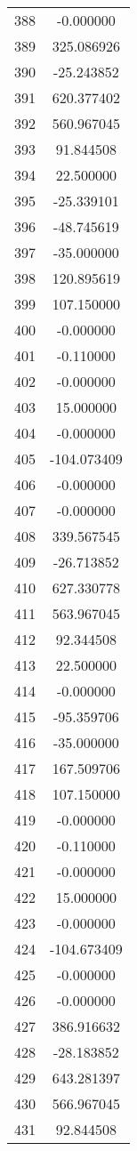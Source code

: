 \documentclass[12pt]{article}
\begin{document}
\begin{longtable}{@{}cc@{}}
388 & -0.000000 \\
389 & 325.086926 \\
390 & -25.243852 \\
391 & 620.377402 \\
392 & 560.967045 \\
393 & 91.844508 \\
394 & 22.500000 \\
395 & -25.339101 \\
396 & -48.745619 \\
397 & -35.000000 \\
398 & 120.895619 \\
399 & 107.150000 \\
400 & -0.000000 \\
401 & -0.110000 \\
402 & -0.000000 \\
403 & 15.000000 \\
404 & -0.000000 \\
405 & -104.073409 \\
406 & -0.000000 \\
407 & -0.000000 \\
408 & 339.567545 \\
409 & -26.713852 \\
410 & 627.330778 \\
411 & 563.967045 \\
412 & 92.344508 \\
413 & 22.500000 \\
414 & -0.000000 \\
415 & -95.359706 \\
416 & -35.000000 \\
417 & 167.509706 \\
418 & 107.150000 \\
419 & -0.000000 \\
420 & -0.110000 \\
421 & -0.000000 \\
422 & 15.000000 \\
423 & -0.000000 \\
424 & -104.673409 \\
425 & -0.000000 \\
426 & -0.000000 \\
427 & 386.916632 \\
428 & -28.183852 \\
429 & 643.281397 \\
430 & 566.967045 \\
431 & 92.844508 \\

\end{longtable}
\end{document}
